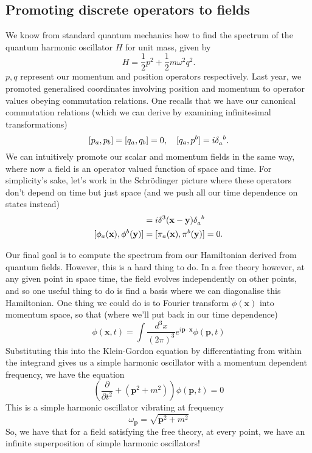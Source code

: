 \subsection{Promoting discrete operators to fields}
We know from standard quantum mechanics how to find the spectrum of the quantum harmonic oscillator $H$ for unit mass, given by 
\[
H  = \frac{1}{2}  p^2 + \frac{1}{2} m \omega^2 q^2. 
\]
$p, q$ represent our momentum and position operators respectively. Last year, we promoted generalised coordinates involving position and momentum to operator values obeying commutation relations. One recalls that we have our canonical commutation relations (which we can derive by examining infinitesimal transformations)
\[ 
[p_a, p_b] = [q_a, q_b] = 0, \quad [q_a, p^b] = i \delta \indices{_a^b}. 
\] 
We can intuitively promote our scalar and momentum fields in the same way, where now a field is an operator valued function of space and time. For simplicity's sake, let's work in the Schrödinger picture where these operators don't depend on time but just space (and we push all our time dependence on states instead)
\begin{align*}
[\phi_a(\mathbf{x}), \pi^b(\mathbf{y})] & = i \delta^3 (\mathbf{x} - \mathbf{y}) \delta\indices{_a^b} \\ 
[\phi_a(\mathbf{x}), \phi^b(\mathbf{y})] &= [\pi_a(\mathbf{x}), \pi^b ( \mathbf{y} ) ] = 0. 
\end{align*}

Our final goal is to compute the spectrum from our Hamiltonian derived from quantum fields. However, this is a hard thing to do. In a free theory however, at any given point in space time, the field evolves independently on other points, and so one useful thing to do is find a basis where we can diagonalise this Hamiltonian. One thing we could do is to Fourier transform $\phi(\mathbf{x} ) $ into momentum space, so that (where we'll put back in our time dependence) 
\[
\phi( \mathbf{x}, t ) = \int \frac{ d^3 x }{ ( 2 \pi )^3 } e^{ i \mathbf{p} \cdot \mathbf{ x} }  \phi( \mathbf{ p }, t ) 
\]
Substituting this into the Klein-Gordon equation by differentiating from within the integrand gives us a simple harmonic oscillator with a momentum dependent frequency, we have the equation 
\[
\left( \frac{ \partial}{ \partial t^ 2 } + ( \mathbf{p}^ 2 + m^2 ) \right) \phi( \mathbf{p}, t ) = 0 
\] This is a simple harmonic oscillator vibrating at frequency 
\[ 
\omega_\mathbf{p} = \sqrt{ \mathbf{p}^2 + m^2 } 
\] So, we have that for a field satisfying the free theory, at every point, we have an infinite superposition of simple harmonic oscillators!

